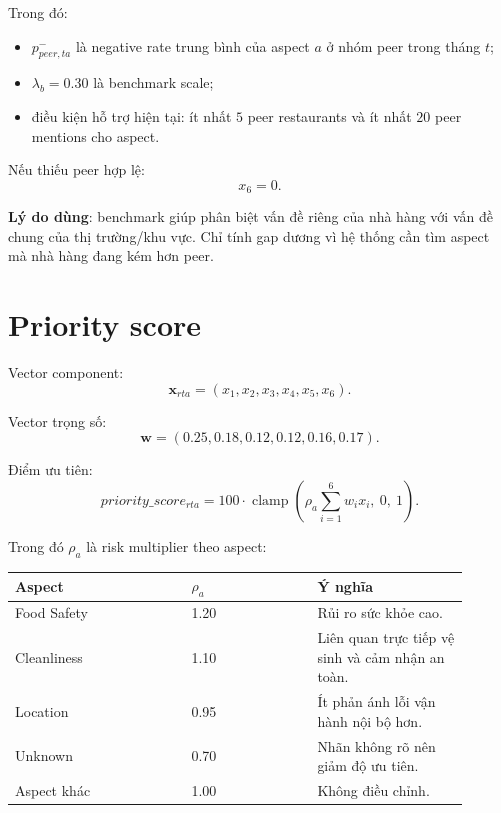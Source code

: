 \documentclass[12pt,a4paper]{article}
\begin{document}
Trong đó:
\begin{itemize}
  \item $p^{-}_{peer,ta}$ là negative rate trung bình của aspect $a$ ở nhóm peer trong tháng $t$;
  \item $\lambda_b=0.30$ là benchmark scale;
  \item điều kiện hỗ trợ hiện tại: ít nhất $5$ peer restaurants và ít nhất $20$ peer mentions cho aspect.
\end{itemize}

Nếu thiếu peer hợp lệ:
\begin{equation}
x_6=0.
\end{equation}

\textbf{Lý do dùng}: benchmark giúp phân biệt vấn đề riêng của nhà hàng với vấn đề chung của thị trường/khu vực. Chỉ tính gap dương vì hệ thống cần tìm aspect mà nhà hàng đang kém hơn peer.

\section{Priority score}

Vector component:
\begin{equation}
\mathbf{x}_{rta}=(x_1,x_2,x_3,x_4,x_5,x_6).
\end{equation}

Vector trọng số:
\begin{equation}
\mathbf{w}=(0.25,0.18,0.12,0.12,0.16,0.17).
\end{equation}

Điểm ưu tiên:
\begin{equation}
priority\_score_{rta}
=100\cdot
\operatorname{clamp}
\left(
\rho_a\sum_{i=1}^{6}w_ix_i,\ 0,\ 1
\right).
\end{equation}

Trong đó $\rho_a$ là risk multiplier theo aspect:

\begin{longtable}{p{0.35\linewidth}p{0.25\linewidth}p{0.30\linewidth}}
\toprule
\textbf{Aspect} & \textbf{$\rho_a$} & \textbf{Ý nghĩa}\\
\midrule
Food Safety & 1.20 & Rủi ro sức khỏe cao.\\
Cleanliness & 1.10 & Liên quan trực tiếp vệ sinh và cảm nhận an toàn.\\
Location & 0.95 & Ít phản ánh lỗi vận hành nội bộ hơn.\\
Unknown & 0.70 & Nhãn không rõ nên giảm độ ưu tiên.\\
Aspect khác & 1.00 & Không điều chỉnh.\\
\bottomrule
\end{longtable}
\end{document}
